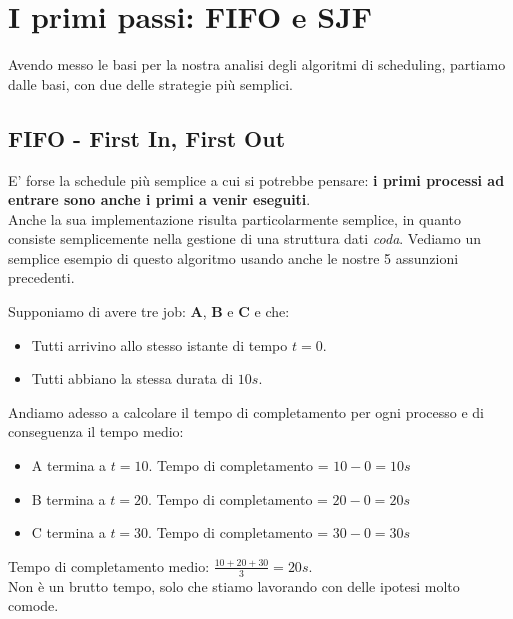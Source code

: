 \documentclass[12pt]{report}
\begin{document}
	\section{I primi passi: FIFO e SJF}
	Avendo messo le basi per la nostra analisi degli algoritmi di scheduling, partiamo dalle basi, con due delle strategie più semplici.
	
	\subsection{FIFO - First In, First Out}
	E' forse la schedule più semplice a cui si potrebbe pensare: \textbf{i primi processi ad entrare sono anche i primi a venir eseguiti}.\\
	Anche la sua implementazione risulta particolarmente semplice, in quanto consiste semplicemente nella gestione di una struttura dati \textit{coda}. Vediamo un semplice esempio di questo algoritmo usando anche le nostre 5 assunzioni precedenti.
	\smallbreak

	Supponiamo di avere tre job: \textbf{A}, \textbf{B} e \textbf{C} e che:
	\begin{itemize}
		\item Tutti arrivino allo stesso istante di tempo $t=0$.
		
		\item Tutti abbiano la stessa durata di $10s$.
	\end{itemize}
	
	\begin{figure}[htbp]
		\centering
		\label{fig:linea_temporale_job}
	\end{figure}
	
	Andiamo adesso a calcolare il tempo di completamento per ogni processo e di conseguenza il tempo medio:
	\begin{itemize}
		\item A termina a $t=10$. Tempo di completamento = $10-0=10s$
		\item B termina a $t=20$. Tempo di completamento = $20-0=20s$
		\item C termina a $t=30$. Tempo di completamento = $30-0=30s$
	\end{itemize}
	Tempo di completamento medio: $\frac{10+20+30}{3} = 20s$.\\
	Non è un brutto tempo, solo che stiamo lavorando con delle ipotesi molto comode.
	\smallbreak
	
\end{document}
